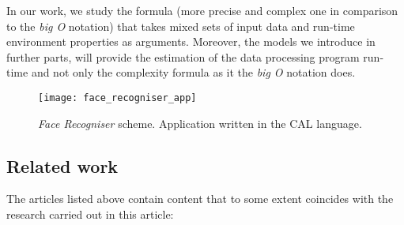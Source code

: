 In our work, we study the formula (more precise and complex one in comparison to the \textit{big O} notation) that takes mixed sets of input data and run-time environment properties as arguments. Moreover, the models we introduce in further parts, will provide the estimation of the data processing program run-time and not only the complexity formula as it the \textit{big O} notation does. 

\begin{figure*}[!t]
	\centering
	\begin{minipage}{0.9\linewidth}
		\texttt{[image: face\_recogniser\_app]}
	\end{minipage}
	\caption{\textit{Face Recogniser} scheme. Application written in the CAL language.}
	\label{fig:face_recogniser_app}
\end{figure*}

\subsection{Related work}

The articles listed above contain content that to some extent coincides with the research carried out in this article:

